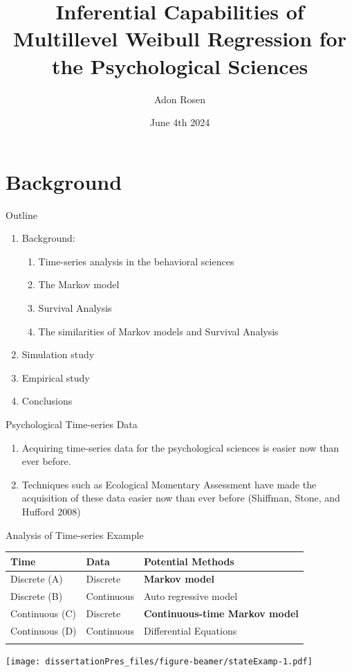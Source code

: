 \documentclass[
  ignorenonframetext,
]{beamer}
\title{Inferential Capabilities of Multillevel Weibull Regression for
the Psychological Sciences}
\author{Adon Rosen}
\date{June 4th 2024}
\institute{University of Oklahoma}
\providecommand{\tightlist}{%
  \setlength{\itemsep}{0pt}\setlength{\parskip}{0pt}}
\begin{document}
\frame{\titlepage}

\section{Background}\label{background}

\begin{frame}{Outline}
\label{outline}
\begin{enumerate}
\tightlist
\item
  Background:

  \begin{enumerate}
  \tightlist
  \item
    Time-series analysis in the behavioral sciences
  \item
    The Markov model
  \item
    Survival Analysis
  \item
    The similarities of Markov models and Survival Analysis
  \end{enumerate}
\item
  Simulation study
\item
  Empirical study
\item
  Conclusions
\end{enumerate}
\end{frame}

\begin{frame}{Psychological Time-series Data}
\label{psychological-time-series-data}
\begin{enumerate}
\item
  Acquiring time-series data for the psychological sciences is easier
  now than ever before.
\item
  Techniques such as Ecological Momentary Assessment have made the
  acquisition of these data easier now than ever before (Shiffman,
  Stone, and Hufford 2008)
\end{enumerate}
\end{frame}

\begin{frame}{Analysis of Time-series Example}
\label{analysis-of-time-series-example}
\begin{longtable}[]{@{}lll@{}}
\toprule\noalign{}
Time & Data & Potential Methods \\
\midrule\noalign{}
\endhead
Discrete (A) & Discrete & \textbf{Markov model} \\
Discrete (B) & Continuous & Auto regressive model \\
Continuous (C) & Discrete & \textbf{Continuous-time Markov model} \\
Continuous (D) & Continuous & Differential Equations \\
\bottomrule\noalign{}
\end{longtable}

\texttt{[image: dissertationPres\_files/figure-beamer/stateExamp-1.pdf]}
\end{frame}
\end{document}
